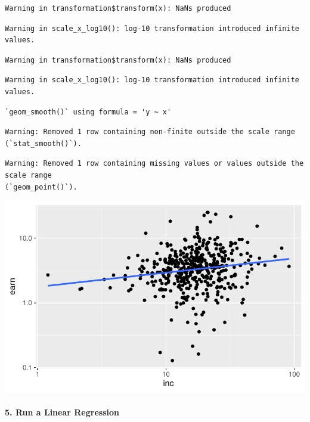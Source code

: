 \documentclass[
  letterpaper,
  DIV=11,
  numbers=noendperiod]{scrartcl}
\let\oldparagraph\paragraph
\renewcommand{\paragraph}[1]{\oldparagraph{#1}\mbox{}}
\begin{document}
\begin{verbatim}
Warning in transformation$transform(x): NaNs produced
\end{verbatim}

\begin{verbatim}
Warning in scale_x_log10(): log-10 transformation introduced infinite values.
\end{verbatim}

\begin{verbatim}
Warning in transformation$transform(x): NaNs produced
\end{verbatim}

\begin{verbatim}
Warning in scale_x_log10(): log-10 transformation introduced infinite values.
\end{verbatim}

\begin{verbatim}
`geom_smooth()` using formula = 'y ~ x'
\end{verbatim}

\begin{verbatim}
Warning: Removed 1 row containing non-finite outside the scale range
(`stat_smooth()`).
\end{verbatim}

\begin{verbatim}
Warning: Removed 1 row containing missing values or values outside the scale range
(`geom_point()`).
\end{verbatim}

\includegraphics{Ch4.Describing-Variables_files/figure-pdf/unnamed-chunk-5-2.pdf}

\paragraph{5. Run a Linear Regression}\label{run-a-linear-regression}
\end{document}
